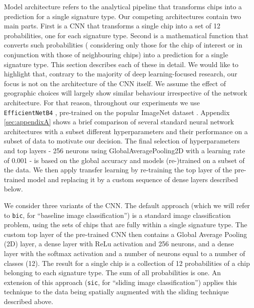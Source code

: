 Model architecture refers to the analytical pipeline that transforms chips
into a prediction for a single signature type. Our competing architectures
contain two main parts. First is a CNN that transforms a single chip into a
set of 12 probabilities, one for each signature type.
Second is a mathematical function that converts such probabilities (
considering only those for the chip of interest or in conjunction with
those of neighbouring chips) into a
prediction for a single signature type. This section describes each of these in detail.
We would like to highlight that, contrary to the majority of deep
learning-focused research, our focus is not on the architecture of the CNN
itself. We assume the effect of geographic choices will largely show similar
behaviour irrespective of the network architecture. For that reason, throughout
our experiments we use \texttt{EfficientNetB4} \citep{https://doi.org/10.48550/arxiv.1905.11946}, pre-trained
on the popular ImageNet dataset \citep{deng2009imagenet}. Appendix \ref*{sec:appendixA} shows a brief comparison of
several standard neural network architectures with a subset different hyperparameters and their performance on a subset of data
to motivate our decision. The final selection of hyperparameters and top layers -
256 neurons using GlobalAveragePooling2D with a learning rate of 0.001 - is based on the global accuracy and models
(re-)trained on a subset of the data. We then apply transfer learning by re-training the
top layer of the pre-trained model and replacing it by a
custom sequence of dense layers described below.

We consider three variants of the CNN.
The default approach (which we will refer to \texttt{bic}, for ``baseline
image classification'') is a standard image classification problem, using the sets of chips
that are fully within a single signature type. The custom top layer of the pre-trained CNN then contains a Global Average
Pooling (2D) layer, a dense layer with ReLu activation and 256 neurons, and a dense
layer with the softmax activation and a number of neurons equal to a number of classes
(12). The result for a single chip is a collection of 12 probabilities
of a chip belonging to each signature type. The sum of all probabilities is
one.
An extension of this approach (\texttt{sic}, for ``sliding image
classification'') applies this technique to the data being spatially augmented
with the sliding technique described above.

